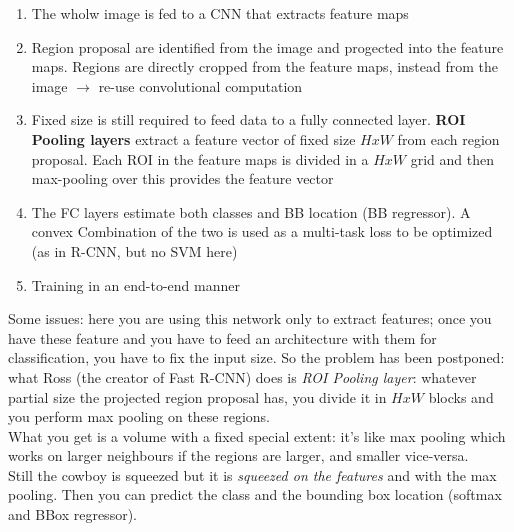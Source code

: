 
\begin{enumerate}
    \item The wholw image is fed to a CNN that extracts feature maps
    \item Region proposal are identified from the image and progected into the feature maps. Regions are directly cropped from the feature maps, instead from the image $\rightarrow$ re-use convolutional computation
    \item Fixed size is still required to feed data to a fully connected layer. \textbf{ROI Pooling layers} extract a feature vector of fixed size $HxW$ from each region proposal. Each ROI in the feature maps is divided in a $HxW$ grid and then max-pooling over this provides the feature vector
    \item The FC layers estimate both classes and BB location (BB regressor). A convex Combination of the two is used as a multi-task loss to be optimized (as in R-CNN, but no SVM here)
    \item Training in an end-to-end manner
\end{enumerate}{}

Some issues: here you are using this network only to extract features; once you have these feature and you have to feed an architecture with them for classification, you have to fix the  input size. So the problem has been postponed: what Ross (the creator of Fast R-CNN) does is \textit{ROI Pooling layer}: whatever partial size the projected region proposal has, you divide it in $HxW$ blocks and you perform max pooling on these regions. \\
What you get is a volume with a fixed special extent: it's like max pooling which works on larger neighbours if the regions are larger, and smaller vice-versa. \\
Still the cowboy is squeezed but it is \textit{squeezed on the features} and with the max pooling. Then you can predict the class and the bounding box location (softmax and BBox regressor). \\ \\

